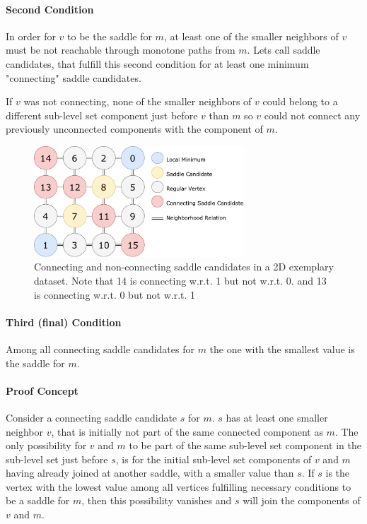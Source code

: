 \documentclass[%
	paper=A4,					%
	twoside=true,				%
	openright,					%
	parskip=full,				%
	chapterprefix=true,			%
	11pt,						%
	headings=normal,			%
	bibliography=totoc,			%
	listof=totoc,				%
	titlepage=on,				%
	captions=tableabove,		%
	draft=false,				%
]{scrreprt}%
\begin{document}
\paragraph{Second Condition} In order for \(v\) to be the saddle for \(m\), at least one of the smaller neighbors of \(v\) must be not reachable through monotone paths from \(m\). Lets call saddle candidates, that fulfill this second condition for at least one minimum "connecting" saddle candidates.

If \(v\) was not connecting, none of the smaller neighbors of \(v\) could belong to a different sub-level set component just before \(v\) than \(m\) so \(v\) could not connect any previously unconnected components with the component of \(m\).

\begin{figure}[h!]
\centering
\includegraphics[width=0.7\textwidth]{figures/ConnectedSaddleCandidates.pdf}
\caption{Connecting and non-connecting saddle candidates in a 2D exemplary dataset. Note that 14 is connecting w.r.t. 1 but not w.r.t. 0. and 13 is connecting w.r.t. 0 but not w.r.t. 1}
\label{fig:csc}
\end{figure}

\paragraph{Third (final) Condition} Among all connecting saddle candidates for \(m\) the one with the smallest value is the saddle for \(m\).

\paragraph{Proof Concept}
Consider a connecting saddle candidate \(s\) for \(m\). \(s\) has at least one smaller neighbor \(v\), that is initially not part of the same connected component as \(m\). The only possibility for \(v\) and \(m\) to be part of the same sub-level set component in the sub-level set just before \(s\), is for the initial sub-level set components of \(v\) and \(m\) having already joined at another saddle, with a smaller value than \(s\). If \(s\) is the vertex with the lowest value among all vertices fulfilling necessary conditions to be a saddle for \(m\), then this possibility vanishes and \(s\) will join the components of \(v\) and \(m\).
\end{document}
